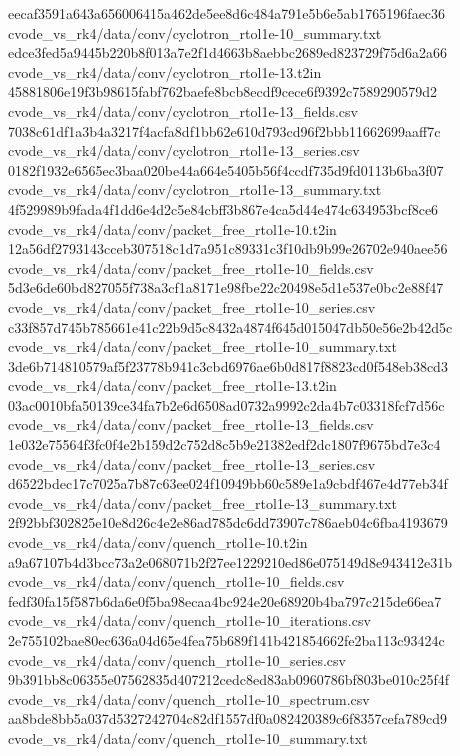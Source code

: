 \documentclass[
  10pt,
]{article}
\newenvironment{Shaded}{}{}
\newcommand{\NormalTok}[1]{#1}
\begin{document}
\begin{Shaded}
\begin{Highlighting}[]
\NormalTok{eecaf3591a643a656006415a462de5ee8d6c484a791e5b6e5ab1765196faec36  cvode\_vs\_rk4/data/conv/cyclotron\_rtol1e{-}10\_summary.txt}
\NormalTok{edce3fed5a9445b220b8f013a7e2f1d4663b8aebbc2689ed823729f75d6a2a66  cvode\_vs\_rk4/data/conv/cyclotron\_rtol1e{-}13.t2in}
\NormalTok{45881806e19f3b98615fabf762baefe8bcb8ecdf9cece6f9392c7589290579d2  cvode\_vs\_rk4/data/conv/cyclotron\_rtol1e{-}13\_fields.csv}
\NormalTok{7038c61df1a3b4a3217f4acfa8df1bb62e610d793cd96f2bbb11662699aaff7c  cvode\_vs\_rk4/data/conv/cyclotron\_rtol1e{-}13\_series.csv}
\NormalTok{0182f1932e6565ec3baa020be44a664e5405b56f4ccdf735d9fd0113b6ba3f07  cvode\_vs\_rk4/data/conv/cyclotron\_rtol1e{-}13\_summary.txt}
\NormalTok{4f529989b9fada4f1dd6e4d2c5e84cbff3b867e4ca5d44e474c634953bcf8ce6  cvode\_vs\_rk4/data/conv/packet\_free\_rtol1e{-}10.t2in}
\NormalTok{12a56df2793143cceb307518c1d7a951c89331c3f10db9b99e26702e940aee56  cvode\_vs\_rk4/data/conv/packet\_free\_rtol1e{-}10\_fields.csv}
\NormalTok{5d3e6de60bd827055f738a3cf1a8171e98fbe22c20498e5d1e537e0bc2e88f47  cvode\_vs\_rk4/data/conv/packet\_free\_rtol1e{-}10\_series.csv}
\NormalTok{c33f857d745b785661e41c22b9d5c8432a4874f645d015047db50e56e2b42d5c  cvode\_vs\_rk4/data/conv/packet\_free\_rtol1e{-}10\_summary.txt}
\NormalTok{3de6b714810579af5f23778b941c3cbd6976ae6b0d817f8823cd0f548eb38cd3  cvode\_vs\_rk4/data/conv/packet\_free\_rtol1e{-}13.t2in}
\NormalTok{03ac0010bfa50139ce34fa7b2e6d6508ad0732a9992c2da4b7c03318fcf7d56c  cvode\_vs\_rk4/data/conv/packet\_free\_rtol1e{-}13\_fields.csv}
\NormalTok{1e032e75564f3fc0f4e2b159d2c752d8c5b9e21382edf2dc1807f9675bd7e3c4  cvode\_vs\_rk4/data/conv/packet\_free\_rtol1e{-}13\_series.csv}
\NormalTok{d6522bdec17c7025a7b87c63ee024f10949bb60c589e1a9cbdf467e4d77eb34f  cvode\_vs\_rk4/data/conv/packet\_free\_rtol1e{-}13\_summary.txt}
\NormalTok{2f92bbf302825e10e8d26c4e2e86ad785dc6dd73907c786aeb04c6fba4193679  cvode\_vs\_rk4/data/conv/quench\_rtol1e{-}10.t2in}
\NormalTok{a9a67107b4d3bcc73a2e068071b2f27ee1229210ed86e075149d8e943412e31b  cvode\_vs\_rk4/data/conv/quench\_rtol1e{-}10\_fields.csv}
\NormalTok{fedf30fa15f587b6da6e0f5ba98ecaa4bc924e20e68920b4ba797c215de66ea7  cvode\_vs\_rk4/data/conv/quench\_rtol1e{-}10\_iterations.csv}
\NormalTok{2e755102bae80ec636a04d65e4fea75b689f141b421854662fe2ba113c93424c  cvode\_vs\_rk4/data/conv/quench\_rtol1e{-}10\_series.csv}
\NormalTok{9b391bb8c06355e07562835d407212cedc8ed83ab0960786bf803be010c25f4f  cvode\_vs\_rk4/data/conv/quench\_rtol1e{-}10\_spectrum.csv}
\NormalTok{aa8bde8bb5a037d5327242704c82df1557df0a082420389c6f8357cefa789cd9  cvode\_vs\_rk4/data/conv/quench\_rtol1e{-}10\_summary.txt}

\end{Highlighting}
\end{Shaded}
\end{document}
